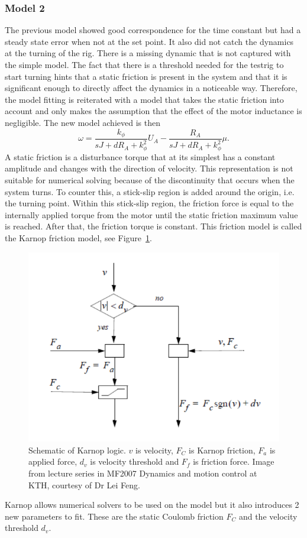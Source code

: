 \subsubsection{Model 2}
The previous model showed good correspondence for the time constant but had a
steady state error when not at the set point. It also did not catch the dynamics
at the turning of the rig. There is a missing dynamic that is not captured with
the simple model. The fact that there is a threshold needed for the testrig to
start turning hints that a static friction is present in the system and that it
is significant enough to directly affect the dynamics in a noticeable way.
Therefore, the model fitting is reiterated with a model that takes the static
friction into account and only makes the assumption that the effect of the motor
inductance is negligible. The new model achieved is then
\begin{equation} \label{eq:model2}
    \omega = \frac {k_{\phi}} {sJ + d R_A + k_{\phi}^2} U_A -
    \frac {R_A} {sJ + d R_A + k_{\phi}^2} \mu.
\end{equation}
A static friction is a disturbance torque that at its simplest has a constant
amplitude and changes with the direction of velocity. This representation is not
suitable for numerical solving because of the discontinuity that occurs when the
system turns. To counter this, a stick-slip region is added around the origin,
i.e. the turning point. Within this stick-slip region, the friction force is
equal to the internally applied torque from the motor until the static friction
maximum value is reached. After that, the friction torque is constant. This
friction model is called the Karnop friction model, see Figure~\ref{fig:karnop}.
\begin{figure}[H]
    \centering
    \includegraphics[width=\textwidth]{./img/testrig_karnoplogic.png}
    \caption{Schematic of Karnop logic. $v$ is velocity, $F_C$ is Karnop friction, $F_a$
    is applied force, $d_v$ is velocity threshold and $F_f$ is friction force. Image from
lecture series in MF2007 Dynamics and motion control at KTH, courtesy of Dr Lei
Feng.}\label{fig:karnop}
\end{figure}
Karnop allows numerical solvers to be used on the model but it also introduces 2 new
parameters to fit. These are the static Coulomb friction $F_C$ and the velocity
threshold $d_v$.

